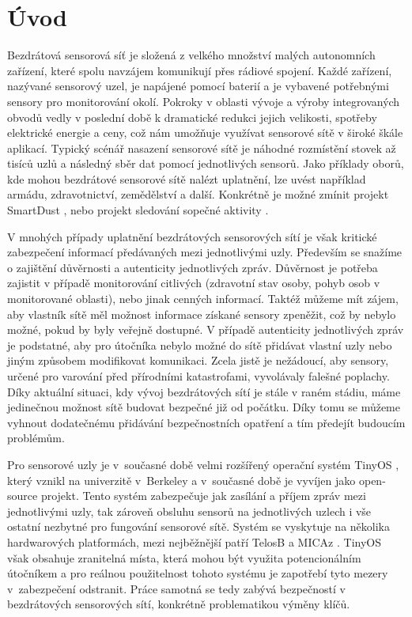 \documentclass[11pt,final,twoside]{fithesis2}
\begin{document}
\tableofcontents

\chapter{Úvod}
Bezdrátová sensorová síť je složená z velkého množství malých autonomních zařízení, které spolu navzájem komunikují přes rádiové spojení. Každé zařízení, nazývané sensorový uzel, je napájené pomocí
baterií a je vybavené potřebnými sensory pro monitorování okolí. Pokroky v oblasti vývoje a výroby integrovaných obvodů vedly v poslední době k dramatické redukci jejich velikosti, spotřeby elektrické 
energie a ceny, což nám umožňuje využívat sensorové sítě v široké škále aplikací. Typický scénář nasazení sensorové sítě je náhodné rozmístění stovek až tisíců uzlů a následný sběr dat pomocí jednotlivých 
sensorů. Jako příklady oborů, kde mohou bezdrátové sensorové sítě nalézt uplatnění, lze uvést například armádu, zdravotnictví, zemědělství a další. Konkrétně je možné zmínit projekt SmartDust 
\cite{Kahn1999}, nebo projekt sledování sopečné aktivity \cite{Werner-Allen2006}. 

V mnohých případy uplatnění bezdrátových sensorových sítí je však kritické zabezpečení informací předávaných mezi jednotlivými uzly. Především se snažíme o zajištění důvěrnosti a autenticity jednotlivých 
zpráv. Důvěrnost je potřeba zajistit v případě monitorování citlivých (zdravotní stav osoby, pohyb osob v monitorované oblasti), nebo jinak cenných informací. Taktéž můžeme mít zájem, aby vlastník sítě měl 
možnost informace získané sensory zpeněžit, což by nebylo možné, pokud by byly veřejně dostupné. V případě autenticity jednotlivých zpráv je podstatné, aby pro útočníka nebylo možné do sítě přidávat vlastní 
uzly nebo jiným způsobem modifikovat komunikaci. Zcela jistě je nežádoucí, aby sensory, určené pro varování před přírodními katastrofami, vyvolávaly falešné poplachy. Díky aktuální situaci, kdy vývoj 
bezdrátových sítí je stále v raném stádiu, máme jedinečnou možnost sítě budovat bezpečné již od počátku. Díky tomu se můžeme vyhnout dodatečnému přidávání bezpečnostních opatření a tím předejít 
budoucím problémům.

Pro sensorové uzly je v~současné době velmi rozšířený operační systém TinyOS \cite{Levis2005}, který vznikl na univerzitě v~Berkeley a v~současné době je vyvíjen jako open-source projekt.  Tento systém 
zabezpečuje jak zasílání a příjem zpráv mezi jednotlivými uzly, tak zároveň obsluhu sensorů na jednotlivých uzlech i vše ostatní nezbytné pro fungování sensorové sítě. Systém se vyskytuje na několika 
hardwarových platformách, mezi nejběžnější patří TelosB a MICAz \cite{Inc.}\cite{MemsicInc.}. TinyOS však obsahuje zranitelná místa, která mohou být využita potencionálním útočníkem \cite{Drexler2010} a pro 
reálnou použitelnost tohoto systému je zapotřebí tyto mezery v~zabezpečení odstranit. Práce samotná se tedy zabývá bezpečností v bezdrátových sensorových sítí, konkrétně problematikou výměny klíčů.
\end{document}
